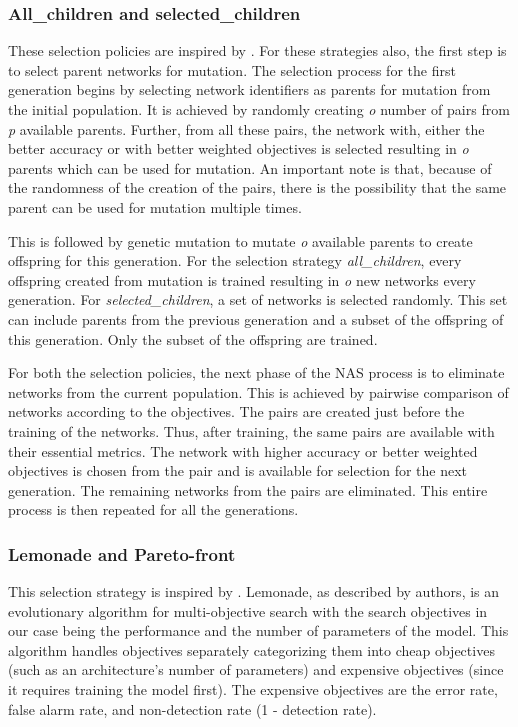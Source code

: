 \subsubsection{All\_children and selected\_children}

These selection policies are inspired by \cite{sun2020automatically}. For these strategies also, the first step is to select parent networks for mutation. The selection process for the first generation begins by selecting network identifiers as parents for mutation from the initial population. It is achieved by randomly creating \textit{o} number of pairs from \textit{p} available parents. Further, from all these pairs, the network with, either the better accuracy or with better weighted objectives is selected resulting in \textit{o} parents which can be used for mutation. An important note is that, because of the randomness of the creation of the pairs, there is the possibility that the same parent can be used for mutation multiple times. 

This is followed by genetic mutation to mutate \textit{o} available parents to create offspring for this generation. For the selection strategy \newline \textit{all\_children}, every offspring created from mutation is trained resulting in \textit{o} new networks every generation. For \textit{selected\_children}, a set of networks is selected randomly. This set can include parents from the previous generation and a subset of the offspring of this generation. Only the subset of the offspring are trained.

For both the selection policies, the next phase of the NAS process is to eliminate networks from the current population. This is achieved by pairwise comparison of networks according to the objectives. The pairs are created just before the training of the networks. Thus, after training, the same pairs are available with their essential metrics. The network with higher accuracy or better weighted objectives is chosen from the pair and is available for selection for the next generation. The remaining networks from the pairs are eliminated. This entire process is then repeated for all the generations.

\subsubsection{Lemonade and Pareto-front}

This selection strategy is inspired by \cite{elsken2018efficient}. Lemonade, as described by authors, is an evolutionary algorithm for multi-objective search with the search objectives in our case being the performance and the number of parameters of the model. This algorithm handles objectives separately categorizing them into cheap objectives (such as an architecture’s number of parameters) and expensive objectives (since it requires training the model first). The expensive objectives are the error rate, false alarm rate, and non-detection rate (1 - detection rate). 

